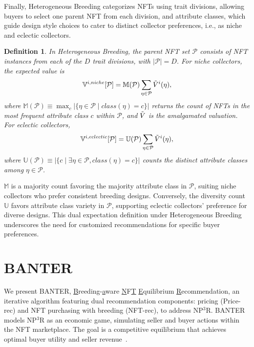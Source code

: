 \documentclass[conference]{IEEEtran}
\theoremstyle{plain}
\newtheorem{definition}{Definition}
\newcommand*{\defeq}{\equiv}
\begin{document}
Finally, Heterogeneous Breeding categorizes NFTs using trait divisions, allowing buyers to select one parent NFT from each division, and attribute classes, which guide design style choices to cater to distinct collector preferences, i.e., as niche and eclectic collectors.

\begin{definition}
    \label{def:heterogeneous-breeding}
    In Heterogeneous Breeding, the parent NFT set $\mathcal{P}$ consists of NFT instances from each of the $D$ trait divisions, with $|\mathcal{P}| = D$. For niche collectors, the expected value is
    \begin{equation}\small
    \label{eqn:v-i-niche}
        \mathbb{V}^{i, niche}[\mathcal{P}] = \mathbb{M}(\mathcal{P})\sum_{\eta\in \mathcal{P}} \Tilde{V}^i(\eta), 
    \end{equation}
    where $\mathbb{M}(\mathcal{P})\defeq \max_c \left|\{\eta \in \mathcal{P} \mid class(\eta) = c\}\right|$ returns the count of NFTs in the most frequent attribute class $c$ within $\mathcal{P}$, and $\Tilde{V}$ is the amalgamated valuation. For eclectic collectors, 
    \begin{equation}\small
    \label{eqn:v-i-eclectic}
        \mathbb{V}^{i, eclectic}[\mathcal{P}] =  \mathbb{U}(\mathcal{P})\sum_{\eta\in \mathcal{P}}\Tilde{V}^i(\eta),
    \end{equation}
    where $\mathbb{U}(\mathcal{P})\defeq \left|\{c \mid \exists \eta \in \mathcal{P}, class(\eta) = c\}\right|$ counts the distinct attribute classes among $\eta\in\mathcal{P}$.
\end{definition}
$\mathbb{M}$ is a majority count favoring the majority attribute class in $\mathcal{P}$, suiting niche collectors who prefer consistent breeding designs. Conversely, the diversity count $\mathbb{U}$ favors attribute class variety in $\mathcal{P}$, supporting eclectic collectors' preference for diverse designs. This dual expectation definition under Heterogeneous Breeding underscores the need for customized recommendations for specific buyer preferences.

\section{BANTER}
\label{sec:method}
    {\fussy We present BANTER, \underline{B}reeding-\underline{a}ware \underline{N}F\underline{T} \underline{E}quilibrium \underline{R}ecommen\-dation, an iterative algorithm featuring dual recommendation components: pricing (Price-rec) and NFT purchasing with breeding (NFT-rec), to address NP$^3$R.} BANTER models NP$^3$R as an economic game, simulating seller and buyer actions within the NFT marketplace. The goal is a competitive equilibrium that achieves optimal buyer utility and seller revenue~\cite{devanur2008market}.
\end{document}
